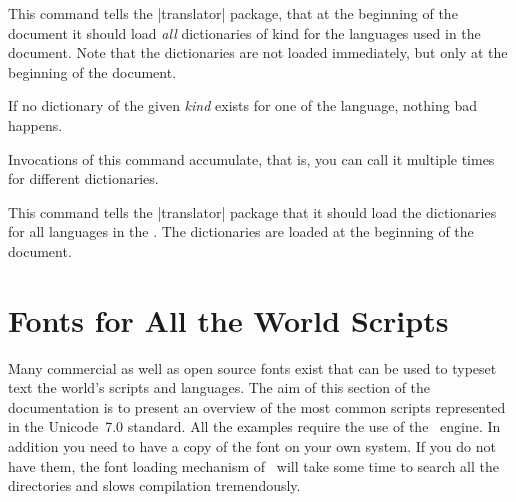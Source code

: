 \begin{teXXX}
\def\captionsdutch{%
    \def\prefacename{Voorwoord}%
    \def\refname{Referenties}%
    \def\abstractname{Samenvatting}%
    \def\bibname{Bibliografie}%
    \def\chaptername{Hoofdstuk}%
    \def\appendixname{Bijlage}%
    \def\contentsname{Inhoudsopgave}%
    \def\listfigurename{Lijst van figuren}%
    \def\listtablename{Lijst van tabellen}%
    \def\indexname{Index}%
    \def\figurename{Figuur}%
    \def\tablename{Tabel}%
    \def\partname{Deel}%
    \def\enclname{Bijlage(n)}%
    \def\ccname{cc}%
    \def\headtoname{Aan}%
    \def\pagename{Pagina}%
    \def\seename{zie}%
    \def\alsoname{zie ook}%
    \def\proofname{Bewijs}%
    \def\glossaryname{Verklarende woordenlijst}%
    \def\today{\number\day~\ifcase\month%
      \or januari\or februari\or maart\or april\or mei\or juni\or
      juli\or augustus\or september\or oktober\or november\or
      december\fi
      \space \number\year}}
\end{teXXX}

\begin{macro}{\usedictionary}
  This command tells the |translator| package, that at the beginning of
  the document it should load \textit{all} dictionaries of kind  for
  the languages used in the document. Note that the dictionaries are
  not loaded immediately, but only at the beginning of the document.

  If no dictionary of the given \emph{kind} exists for one of the
  language, nothing bad happens.

  Invocations of this command accumulate, that is, you can call it
  multiple times for different dictionaries.
\end{macro}

  This command tells the |translator| package that it should load the
  dictionaries for all languages in the . The
  dictionaries are loaded at the beginning of the document.

\section{Fonts for All the World Scripts}

Many commercial as well as open source fonts exist that can be used to typeset text the world's scripts and languages. The aim of this section of the documentation is to present an overview of the most common scripts represented in the Unicode~7.0 standard. All the examples require the use of the \XeTeX\ engine. In addition you need to have a copy of the font on your own system. If you do not have them, the font loading mechanism of \XeTeX\ will take some time to search all the directories and slows compilation tremendously. 




